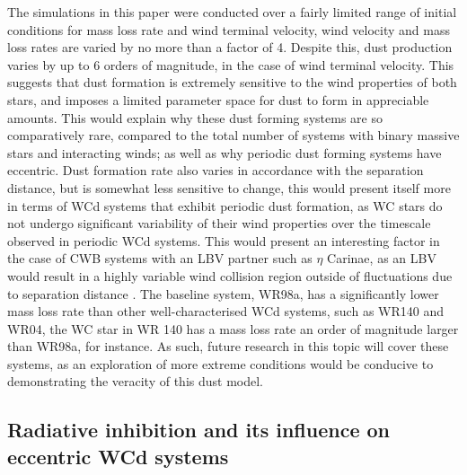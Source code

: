 The simulations in this paper were conducted over a fairly limited range of initial conditions for mass loss rate and wind terminal velocity, wind velocity and mass loss rates are varied by no more than a factor of 4.
Despite this, dust production varies by up to 6 orders of magnitude, in the case of wind terminal velocity.
This suggests that dust formation is extremely sensitive to the wind properties of both stars, and imposes a limited parameter space for dust to form in appreciable amounts.
This would explain why these dust forming systems are so comparatively rare, compared to the total number of systems with binary massive stars and interacting winds; as well as why periodic dust forming systems have eccentric.
Dust formation rate also varies in accordance with the separation distance, but is somewhat less sensitive to change, this would present itself more in terms of WCd systems that exhibit periodic dust formation, as WC stars do not undergo significant variability of their wind properties over the timescale observed in periodic WCd systems.
This would present an interesting factor in the case of CWB systems with an LBV partner such as $\eta$ Carinae, as an LBV would result in a highly variable wind collision region outside of fluctuations due to separation distance \parencite{nazeChangingWindCollision2018}.
The baseline system, WR98a, has a significantly lower mass loss rate than other well-characterised WCd systems, such as WR140 and WR04, the WC star in WR 140 has a mass loss rate an order of magnitude larger than WR98a, for instance.
As such, future research in this topic will cover these systems, as an exploration of more extreme conditions would be conducive to demonstrating the veracity of this dust model.

\subsection{Radiative inhibition and its influence on eccentric WCd systems}


